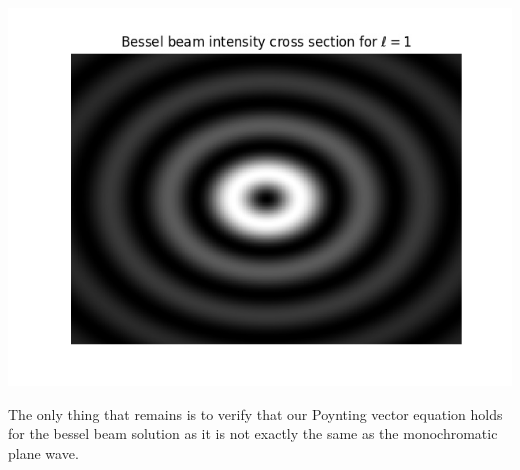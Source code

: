 \documentclass[a4paper, 11pt]{article}
\begin{document}
	\begin{center}
		\includegraphics[scale=0.5]{intensityProfile}
	\end{center}
The only thing that remains is to verify that our Poynting vector equation holds for the bessel beam solution as it is not exactly the same as the monochromatic plane wave. 
\end{document}
